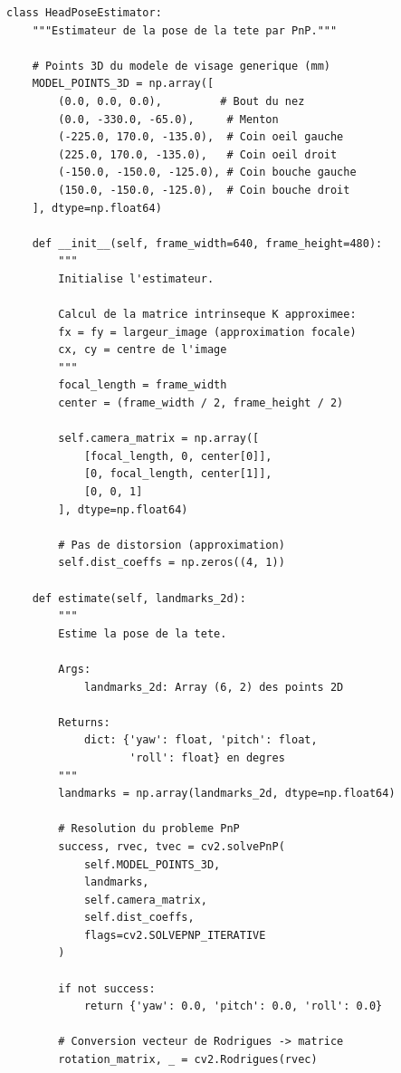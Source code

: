 \begin{lstlisting}[style=pythonstyle, caption={Module d'estimation de la pose de la tête.}, label={lst:head_pose}]
class HeadPoseEstimator:
    """Estimateur de la pose de la tete par PnP."""
    
    # Points 3D du modele de visage generique (mm)
    MODEL_POINTS_3D = np.array([
        (0.0, 0.0, 0.0),         # Bout du nez
        (0.0, -330.0, -65.0),     # Menton
        (-225.0, 170.0, -135.0),  # Coin oeil gauche
        (225.0, 170.0, -135.0),   # Coin oeil droit
        (-150.0, -150.0, -125.0), # Coin bouche gauche
        (150.0, -150.0, -125.0),  # Coin bouche droit
    ], dtype=np.float64)
    
    def __init__(self, frame_width=640, frame_height=480):
        """
        Initialise l'estimateur.
        
        Calcul de la matrice intrinseque K approximee:
        fx = fy = largeur_image (approximation focale)
        cx, cy = centre de l'image
        """
        focal_length = frame_width
        center = (frame_width / 2, frame_height / 2)
        
        self.camera_matrix = np.array([
            [focal_length, 0, center[0]],
            [0, focal_length, center[1]],
            [0, 0, 1]
        ], dtype=np.float64)
        
        # Pas de distorsion (approximation)
        self.dist_coeffs = np.zeros((4, 1))
    
    def estimate(self, landmarks_2d):
        """
        Estime la pose de la tete.
        
        Args:
            landmarks_2d: Array (6, 2) des points 2D
            
        Returns:
            dict: {'yaw': float, 'pitch': float, 
                   'roll': float} en degres
        """
        landmarks = np.array(landmarks_2d, dtype=np.float64)
        
        # Resolution du probleme PnP
        success, rvec, tvec = cv2.solvePnP(
            self.MODEL_POINTS_3D,
            landmarks,
            self.camera_matrix,
            self.dist_coeffs,
            flags=cv2.SOLVEPNP_ITERATIVE
        )
        
        if not success:
            return {'yaw': 0.0, 'pitch': 0.0, 'roll': 0.0}
        
        # Conversion vecteur de Rodrigues -> matrice
        rotation_matrix, _ = cv2.Rodrigues(rvec)
        

\end{lstlisting}
